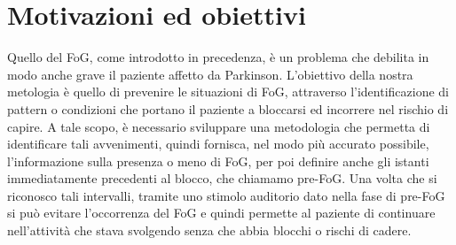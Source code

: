 


\chapter{Motivazioni ed obiettivi}\label{chap4:Goals}
Quello del FoG, come introdotto in precedenza, è un problema che debilita in modo anche grave il paziente affetto da Parkinson. L'obiettivo della nostra metologia è quello di prevenire le situazioni di FoG, attraverso l'identificazione di pattern o condizioni che portano il paziente a bloccarsi ed incorrere nel rischio di capire. A tale scopo, è necessario sviluppare una metodologia che permetta di identificare tali avvenimenti, quindi fornisca, nel modo più accurato possibile, l'informazione sulla presenza o meno di FoG, per poi definire anche gli istanti immediatamente precedenti al blocco, che chiamamo pre-FoG. Una volta che si riconosco tali intervalli, tramite uno stimolo auditorio dato nella fase di pre-FoG si può evitare l'occorrenza del FoG e quindi permette al paziente di continuare nell'attività che stava svolgendo senza che abbia blocchi o rischi di cadere.\\
%

